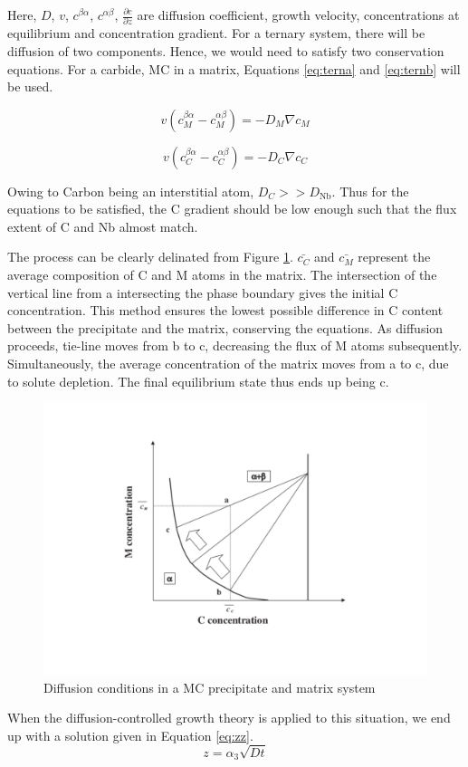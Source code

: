 \documentclass[12pt]{article}
\begin{document}
Here, $D$, $v$, $c^{\beta \alpha}$, $c^{\alpha \beta}$, $\frac{\partial c}{\partial z}$ are diffusion coefficient, growth velocity, concentrations at equilibrium and concentration gradient. 
For a ternary system, there will be diffusion of two components. Hence, we would need to satisfy two conservation equations. For a carbide, MC in a matrix, Equations \ref{eq:terna} and \ref{eq:ternb} will be used.

\begin{equation}
v(c_M^{\beta \alpha}-c_M^{\alpha \beta})=-D_M\nabla c_M
\label{eq:terna}
\end{equation}

\begin{equation}
v(c_C^{\beta \alpha}-c_C^{\alpha \beta})=-D_C\nabla c_C
\label{eq:ternb}
\end{equation}

Owing to Carbon being an interstitial atom, $D_C >> D_\mathrm{Nb}$. Thus for the equations to be satisfied, the C gradient should be low enough such that the flux extent of C and Nb almost match. 

The process can be clearly delinated from Figure \ref{fig:diff}. $\bar{c_C}$ and $\bar{c_M}$ represent the average composition of C and M atoms in the matrix. The intersection of the vertical line from a intersecting the phase boundary gives the initial C concentration. This method ensures the lowest possible difference in C content between the precipitate and the matrix, conserving the equations. As diffusion proceeds, tie-line moves from b to c, decreasing the flux of M atoms subsequently. Simultaneously, the average concentration of the matrix moves from a to c, due to solute depletion. The final equilibrium state thus ends up being c. 

\begin{figure}
\centering
\includegraphics[width=14cm]{phd.pdf}
\caption{Diffusion conditions in a MC precipitate and matrix system}
\label{fig:diff}
\end{figure}
 When the diffusion-controlled growth theory is applied to this situation, we end up with a solution given in Equation \ref{eq:zz}.
\begin{equation}
z=\alpha_3\sqrt{Dt}
\label{eq:zz}
\end{equation}
\end{document}

